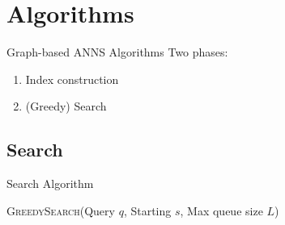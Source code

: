 \section{Algorithms}

\begin{frame}{Graph-based ANNS Algorithms}
    Two phases:
    \begin{enumerate}
        \item Index construction
        \item (Greedy) Search 
    \end{enumerate}
\end{frame}

\subsection{Search}

\begin{frame}{Search Algorithm}
    \begin{algorithm}[H]
        \caption{\textsc{GreedySearch}(Query \(q\), Starting \(s\), Max queue size \(L\))}\label{alg:greedy-search}
        \begin{algorithmic}[1]
                \EndIf
            \EndWhile
        \end{algorithmic}
    \end{algorithm}
\end{frame}

